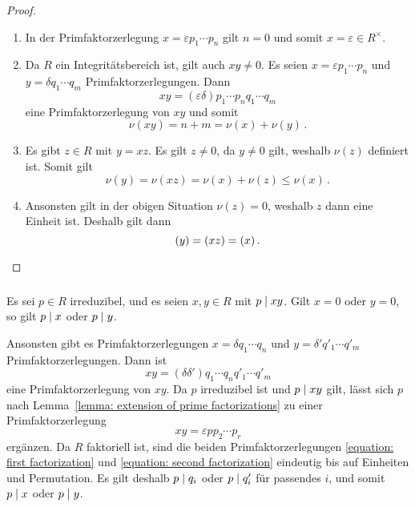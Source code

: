 \begin{proof}\leavevmode
  \begin{enumerate}
    \item
      In der Primfaktorzerlegung $x = \varepsilon p_1 \dotsm p_n$ gilt $n = 0$ und somit $x = \varepsilon \in R^\times$.
    \item
      Da $R$ ein Integritätsbereich ist, gilt auch $xy \neq 0$.
      Es seien $x = \varepsilon p_1 \dotsm p_n$ und $y = \delta q_1 \dotsm q_m$ Primfaktorzerlegungen.
      Dann 
      \[
          xy
        = (\varepsilon \delta) p_1 \dotsm p_n q_1 \dotsm q_m
      \]
      eine Primfaktorzerlegung von $xy$ und somit
      \[
          \nu(xy)
        = n + m
        = \nu(x) + \nu(y) \,.
      \]
    \item
     Es gibt $z \in R$ mit $y = xz$.
     Es gilt $z \neq 0$, da $y \neq 0$ gilt, weshalb $\nu(z)$ definiert ist.
     Somit gilt
     \[
            \nu(y)
       =    \nu(xz)
       =    \nu(x) + \nu(z)
       \leq \nu(x) \,.
     \]
    \item
      Ansonsten gilt in der obigen Situation $\nu(z) = 0$, weshalb $z$ dann eine Einheit ist.
      Deshalb gilt dann
      \[
          (y)
        = (xz)
        = (x) \,.
        \qedhere
      \]
  \end{enumerate}
\end{proof}



\subsubsection{}

Es sei $p \in R$ irreduzibel, und es seien $x, y \in R$ mit $p \mathrel{|} xy$.
Gilt $x = 0$ oder $y = 0$, so gilt $p \mathrel{|} x$ oder $p \mathrel{|} y$.

Ansonsten gibt es Primfaktorzerlegungen $x = \delta q_1 \dotsm q_n$ und $y = \delta' q'_1 \dotsm q'_m$ Primfaktorzerlegungen.
Dann ist
\begin{equation}
  \label{equation: first factorization}
    xy
  = (\delta \delta') q_1 \dotsm q_n q'_1 \dotsm q'_m
\end{equation}
eine Primfaktorzerlegung von $xy$.
Da $p$ irreduzibel ist und $p \mathrel{|} xy$ gilt, lässt sich $p$ nach Lemma~\ref{lemma: extension of prime factorizations} zu einer Primfaktorzerlegung
\begin{equation}
  \label{equation: second factorization}
    xy
  = \varepsilon p p_2 \dotsm p_r
\end{equation}
ergänzen.
Da $R$ faktoriell ist, sind die beiden Primfaktorzerlegungen \eqref{equation: first factorization} und \eqref{equation: second factorization} eindeutig bis auf Einheiten und Permutation.
Es gilt deshalb $p \mathrel{|} q_i$ oder $p \mathrel{|} q'_i$ für passendes $i$, und somit $p \mathrel{|} x$ oder $p \mathrel{|} y$.



